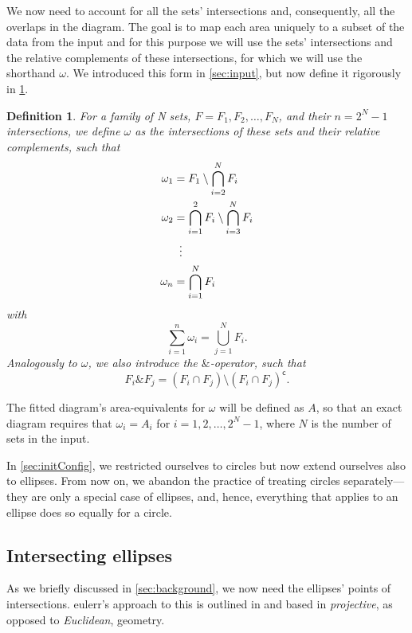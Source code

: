 \documentclass[
  oneside,
  openany,
  numbers=noendperiod,
  parskip=half,
  bibliography=totoc
]{scrbook}\usepackage[]{graphicx}\usepackage{xcolor}
\newcommand{\pkg}[1]{{\fontseries{b}\selectfont #1}}
\newtheorem{mydef}{Definition}[chapter]
\begin{document}
We now need to account for all the sets' intersections and, consequently,
all the overlaps in the diagram. The goal is to map each area uniquely
to a subset of the data from the input and for this purpose we will
use the sets' intersections and the relative complements of these
intersections, for which we will use the shorthand $\omega$. We introduced this
form in \cref{sec:input}, but now define it rigorously in \cref{def:omega}.

\begin{mydef}
\label{def:omega}
For a family of \emph{N} sets, $F = F_1, F_2, \dots, F_N$, and their $n=2^N-1$
intersections, we define $\omega$ as the intersections of these sets and their
relative complements, such that
\begin{align*}
  \omega_{1} & = F_1 \setminus \bigcap_{i=2}^N F_i  \\
  \omega_{2} & = \bigcap_{i=1}^2 F_i \setminus \bigcap_{i=3}^{N} F_i\\
             & \vdotswithin{=} \\
    \omega_n & = \bigcap_{i=1}^{N}F_i
\end{align*}
with
\[
  \sum_{i = 1}^n \omega_i =  \bigcup_{j=1}^N F_i.
\]
Analogously to $\omega$, we also introduce the $\&$-operator, such that
\[
  F_i \& F_j = (F_i \cap F_j)\setminus (F_i \cap F_j)^\textsf{c}.
\]
\end{mydef}

The fitted diagram's area-equivalents for $\omega$ will be defined as $A$, so that
an exact diagram requires that $\omega_i = A_i$ for $i=1,2,\dots,2^N-1$,
where $N$ is the number of sets in the input.

In \cref{sec:initConfig}, we restricted
ourselves to circles but now extend ourselves also to ellipses. From now on,
we abandon the practice of treating circles separately---they are only
a special case of ellipses, and, hence, everything that applies to an ellipse does so
equally for a circle.

\subsection{Intersecting ellipses}
\label{sec:intersecting-ellipses}

As we briefly discussed in \cref{sec:background}, we now need the ellipses'
points of intersections. \pkg{eulerr}'s approach to this is outlined in
\citet{Richter-Gebert_2011} and based in \emph{projective}, as opposed to
\emph{Euclidean}, geometry.
\end{document}
